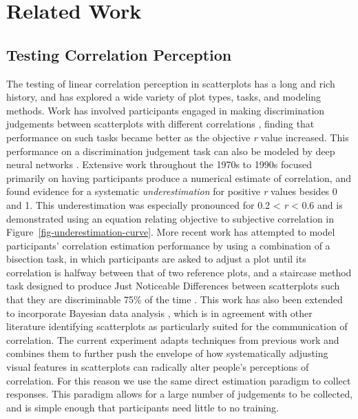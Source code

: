 \documentclass[manuscript, review, anonymous, screen]{acmart}
\begin{document}
\hypertarget{sec-related-work}{%
\section{Related Work}\label{sec-related-work}}

\hypertarget{sec-testing-corr-percept}{%
\subsection{Testing Correlation
Perception}\label{sec-testing-corr-percept}}

The testing of linear correlation perception in scatterplots has a long
and rich history, and has explored a wide variety of plot types, tasks,
and modeling methods. Work has involved participants engaged in making
discrimination judgements between scatterplots with different
correlations \citep{pollack_1960, doherty_2007}, finding that
performance on such tasks became better as the objective \emph{r} value
increased. This performance on a discrimination judgement task can also
be modeled by deep neural networks \citep{yang_2023}. Extensive work
throughout the 1970s to 1990s focused primarily on having participants
produce a numerical estimate of correlation, and found evidence for a
systematic \emph{underestimation} for positive \emph{r} values besides 0
and 1. This underestimation was especially pronounced for 0.2
\textless{} \emph{r} \textless{} 0.6
\citep{strahan_1978, bobko_1979, cleveland_1982, lane_1985, lauer_1989, collyer_1990, meyer_1992}
and is demonstrated using an equation relating objective to subjective
correlation \citep{rensink_2017} in
Figure~\ref{fig-underestimation-curve}. More recent work has attempted
to model participants' correlation estimation performance by using a
combination of a bisection task, in which participants are asked to
adjust a plot until its correlation is halfway between that of two
reference plots, and a staircase method task designed to produce Just
Noticeable Differences between scatterplots such that they are
discriminable 75\% of the time \citep{rensink_2010}. This work has also
been extended to incorporate Bayesian data analysis \citep{kay_2015},
which is in agreement with other literature identifying scatterplots as
particularly suited for the communication of correlation\citep{li_2010}. The
current experiment adapts techniques from previous work
\citep{strain_2023, strain_2023b} and combines them to further push the
envelope of how systematically adjusting visual features in scatterplots
can radically alter people's perceptions of correlation. For this reason
we use the same direct estimation paradigm to collect responses. This
paradigm allows for a large number of judgements to be collected, and is
simple enough that participants need little to no training.
\end{document}
